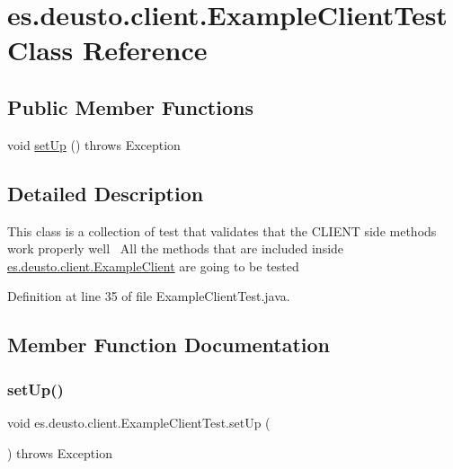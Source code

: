\hypertarget{classes_1_1deusto_1_1client_1_1_example_client_test}{}\section{es.\+deusto.\+client.\+Example\+Client\+Test Class Reference}
\label{classes_1_1deusto_1_1client_1_1_example_client_test}
\subsection*{Public Member Functions}
\begin{DoxyCompactItemize}
\item 
void \hyperlink{classes_1_1deusto_1_1client_1_1_example_client_test_a61fde1da201769cbe17f77b8772eeeb7}{set\+Up} ()  throws Exception 
\end{DoxyCompactItemize}


\subsection{Detailed Description}
This class is a collection of test that validates that the C\+L\+I\+E\+NT side methods work properly well~\newline
All the methods that are included inside \hyperlink{classes_1_1deusto_1_1client_1_1_example_client}{es.\+deusto.\+client.\+Example\+Client} are going to be tested 

Definition at line 35 of file Example\+Client\+Test.\+java.



\subsection{Member Function Documentation}
\mbox{\label{classes_1_1deusto_1_1client_1_1_example_client_test_a61fde1da201769cbe17f77b8772eeeb7}} 
\subsubsection{\texorpdfstring{set\+Up()}{setUp()}}
{\footnotesize\ttfamily void es.\+deusto.\+client.\+Example\+Client\+Test.\+set\+Up (\begin{DoxyParamCaption}{ }\end{DoxyParamCaption}) throws Exception}


